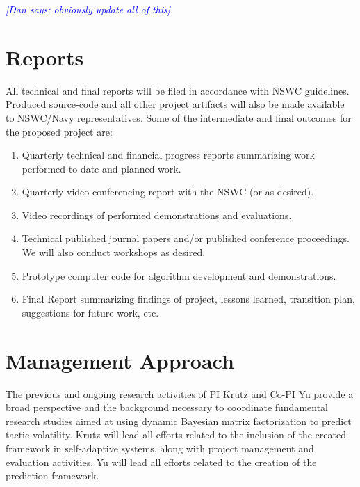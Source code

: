 \documentclass[12pt]{article}
\newcommand{\dan}[1]{\textcolor{blue}{{\it [Dan says: #1]}}}
\begin{document}
\dan{obviously update all of this}






\section{Reports}

All technical and final reports will be filed in accordance with NSWC guidelines. Produced source-code and all other project artifacts will also be made available to NSWC/Navy representatives. Some of the intermediate and final outcomes for the proposed project are:

\begin{enumerate}[noitemsep]
  \item Quarterly technical and financial progress reports summarizing work performed to date and planned work.
  \item Quarterly video conferencing report with the NSWC (or as desired).
  \item Video recordings of performed demonstrations and evaluations.
  \item Technical published journal papers and/or published conference proceedings. We will also conduct workshops as desired.
  \item Prototype computer code for algorithm development and demonstrations.
  \item Final Report summarizing findings of project, lessons learned, transition plan, suggestions for future work, etc.

\end{enumerate}


\section{Management Approach}
The previous and ongoing research activities of PI Krutz and Co-PI Yu provide a broad perspective and the background necessary to coordinate fundamental research studies aimed at using dynamic Bayesian matrix factorization to predict tactic volatility. Krutz will lead all efforts related to the inclusion of the created framework in self-adaptive systems, along with project management and evaluation activities. Yu will lead all efforts related to the creation of the prediction framework. %
\end{document}
